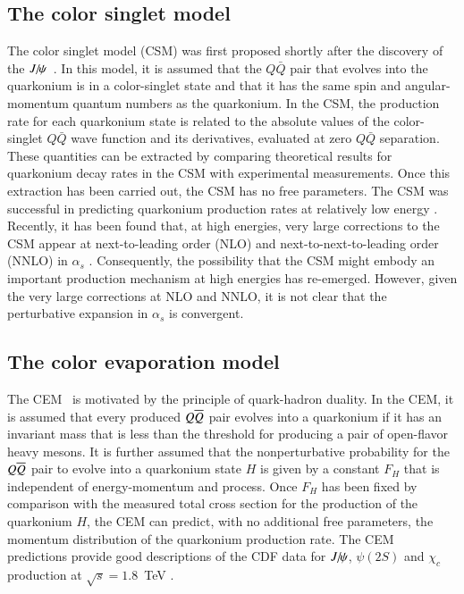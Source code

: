 \subsection{The color singlet model}


The color singlet model (CSM) was first proposed shortly after the discovery of the 
$J\hspace{-.08em}/\hspace{-.14em}\psi$~\cite{Einhorn:1975ua,Berger:1980ni,Ellis:1976fj,Carlson:1976cd}.
In this model, it is assumed that the $Q\bar Q$ pair that evolves into
the quarkonium is in a color-singlet state and that it has the same spin
and angular-momentum quantum numbers as the quarkonium. In the CSM, the
production rate for each quarkonium state is related to the absolute
values of the color-singlet $Q\bar Q$ wave function and its derivatives,
evaluated at zero $Q\bar Q$ separation. These quantities can be
extracted by comparing theoretical results for quarkonium decay
rates in the CSM with experimental measurements. Once this extraction
has been carried out, the CSM has no free parameters. The CSM was
successful in predicting quarkonium production rates at relatively low
energy \cite{Schuler:1994hy}. Recently, it has been found that, at high
energies, very large corrections to the CSM appear at next-to-leading
order (NLO) and next-to-next-to-leading order (NNLO) in $\alpha_s$
\cite{Artoisenet:2007xi,Campbell:2007ws,Artoisenet:2008fc}.
Consequently, the possibility that the CSM might embody an important 
production mechanism at high energies has re-emerged. 
However, given the very large corrections at
NLO and NNLO, it is not clear that the perturbative expansion in
$\alpha_s$ is convergent. 

\subsection{The color evaporation model}  
\label{prod_sec:CEM}

The CEM~\cite{Fritzsch:1977ay,Amundson:1995em,Amundson:1996qr}
is motivated by the principle of quark-hadron duality. In the CEM, it
is assumed that every produced $Q \overline{Q}$ pair evolves into a quarkonium
if it has an invariant mass that is less than the threshold for
producing a pair of open-flavor heavy mesons. It is further assumed that
the nonperturbative probability for the $Q \overline{Q}$ pair to evolve into a
quarkonium state $H$ is given by a constant $F_H$ that is independent of 
energy-momentum and process. Once $F_H$ has been fixed by
comparison with the measured total cross section for the production of
the quarkonium $H$, the CEM can predict, with no additional free
parameters, the momentum distribution of the quarkonium production rate. The
CEM predictions provide good descriptions of the CDF data for $J\hspace{-.08em}/\hspace{-.14em}\psi$,
$\psi(2S)$ and $\chi_{c}$ production at $\sqrt{s}=1.8$~TeV
\cite{Amundson:1996qr}. 


